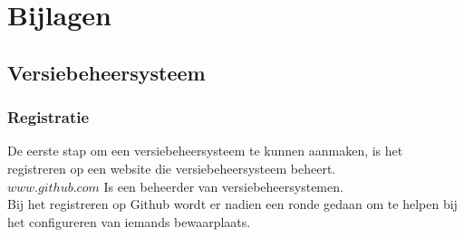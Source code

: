 \documentclass[12pt]{article}
\begin{document}
		\newpage
		
		\newpage
		\listoffigures
		\listoftables
		\newpage
		\printindex	
			
		\section{Bijlagen}\label{Bijlagen}
			\subsection{Versiebeheersysteem}\label{Git}
				\subsubsection{Registratie}
					De eerste stap om een versiebeheersysteem te kunnen aanmaken, is het registreren op een website die versiebeheersysteem beheert.\\
					$www.github.com$ Is een beheerder van versiebeheersystemen.\\
					Bij het registreren op Github wordt er nadien een ronde gedaan om te helpen bij het configureren van iemands bewaarplaats.
					
\end{document}
